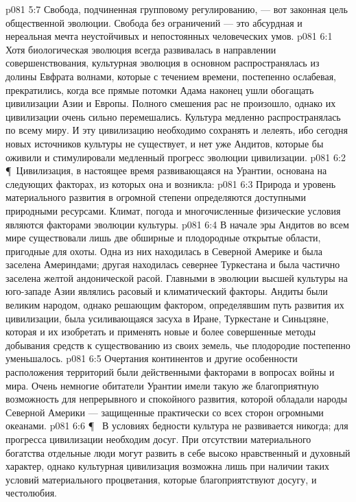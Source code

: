 \vs p081 5:7 Свобода, подчиненная групповому регулированию, --- вот законная цель общественной эволюции. Свобода без ограничений --- это абсурдная и нереальная мечта неустойчивых и непостоянных человеческих умов.
\vs p081 6:1 Хотя биологическая эволюция всегда развивалась в направлении совершенствования, культурная эволюция в основном распространялась из долины Евфрата волнами, которые с течением времени, постепенно ослабевая, прекратились, когда все прямые потомки Адама наконец ушли обогащать цивилизации Азии и Европы. Полного смешения рас не произошло, однако их цивилизации очень сильно перемешались. Культура медленно распространялась по всему миру. И эту цивилизацию необходимо сохранять и лелеять, ибо сегодня новых источников культуры не существует, и нет уже Андитов, которые бы оживили и стимулировали медленный прогресс эволюции цивилизации.
\vs p081 6:2 \P\ Цивилизация, в настоящее время развивающаяся на Урантии, основана на следующих факторах, из которых она и возникла:
\vs p081 6:3 \bibnobreakspace {} Природа и уровень материального развития в огромной степени определяются доступными природными ресурсами. Климат, погода и многочисленные физические условия являются факторами эволюции культуры.
\vs p081 6:4 В начале эры Андитов во всем мире существовали лишь две обширные и плодородные открытые области, пригодные для охоты. Одна из них находилась в Северной Америке и была заселена Америндами; другая находилась севернее Туркестана и была частично заселена желтой андонической расой. Главными в эволюции высшей культуры на юго\hyp{}западе Азии являлись расовый и климатический факторы. Андиты были великим народом, однако решающим фактором, определявшим путь развития их цивилизации, была усиливающаяся засуха в Иране, Туркестане и Синьцзяне, которая и  их изобретать и применять новые и более совершенные методы добывания средств к существованию из своих земель, чье плодородие постепенно уменьшалось.
\vs p081 6:5 Очертания континентов и другие особенности расположения территорий были действенными факторами в вопросах войны и мира. Очень немногие обитатели Урантии имели такую же благоприятную возможность для непрерывного и спокойного развития, которой обладали народы Северной Америки --- защищенные практически со всех сторон огромными океанами.
\vs p081 6:6 \P\ \bibnobreakspace {} В условиях бедности культура не развивается никогда; для прогресса цивилизации необходим досуг. При отсутствии материального богатства отдельные люди могут развить в себе высоко нравственный и духовный характер, однако культурная цивилизация возможна лишь при наличии таких условий материального процветания, которые благоприятствуют досугу, и честолюбия.
